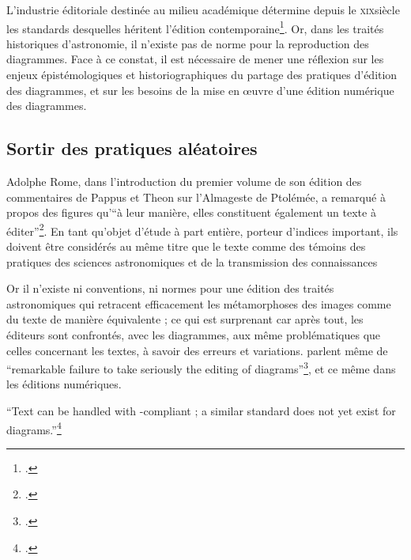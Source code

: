 L'industrie éditoriale destinée au milieu académique détermine depuis le
\textsc{xix}\ieme siècle les standards desquelles héritent l'édition
contemporaine\footcite{epron_ledition_2018}. Or, dans les traités historiques
d'astronomie, il n'existe pas de norme pour la reproduction des
diagrammes. Face à ce constat, il est nécessaire de mener une réflexion
sur les enjeux épistémologiques et historiographiques du partage des pratiques d'édition des diagrammes, et sur les besoins de la
mise en œuvre d'une édition numérique des diagrammes.

\hypertarget{sortir-des-pratiques-aleatoires}{%
\subsection{Sortir des pratiques
aléatoires}\label{sortir-des-pratiques-aleatoires}}

Adolphe Rome, dans l'introduction du premier volume de son édition des
commentaires de Pappus et Theon sur l'Almageste de Ptolémée, a remarqué
à propos des figures qu'``à leur manière, elles constituent également un
texte à éditer''\footcite[Commentaires de Pappus et de Théon d'Alexandre sur
l'Almageste, ed.~by A. Rome (Rome, 1931), i, p.~xxiv.][p.394]{jardine_critical_2010}. En
tant qu'objet d'étude à part entière, porteur d'indices important, ils
doivent être considérés au même titre que le texte comme des témoins des
pratiques des sciences astronomiques et de la transmission des
connaissances

Or il n'existe ni conventions, ni normes pour une édition des traités
astronomiques qui retracent efficacement les métamorphoses des images
comme du texte de manière équivalente ; ce qui est surprenant car après
tout, les éditeurs sont confrontés, avec les diagrammes, aux même
problématiques que celles concernant les textes, à savoir des erreurs et
variations. \citeauthor{jardine_critical_2010} parlent même de ``remarkable failure to take seriously
the editing of diagrams''\footcite[p.393]{jardine_critical_2010}, et ce même dans les éditions
numériques.

\begin{kwote}
``Text can be handled with \tei-compliant \xml ; a similar standard does not
yet exist for diagrams.''\footcite[p.77]{roughan_digital_2014}
\end{kwote}

